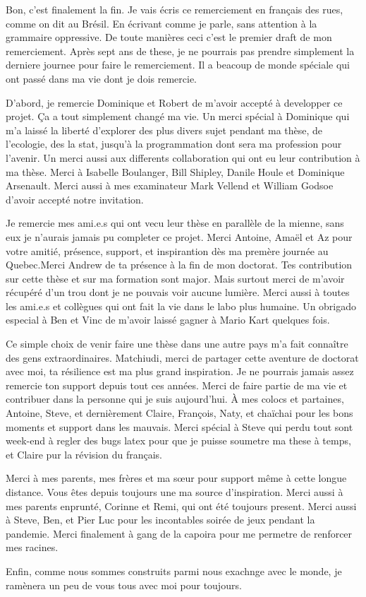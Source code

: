 Bon, c'est finalement la fin. Je vais écris ce remerciement en français des rues, comme on dit au Brésil. En écrivant comme je parle, sans attention à la grammaire oppressive.
De toute manières ceci c'est le premier draft de mon remerciement. Après sept ans de these, je ne pourrais pas prendre simplement la derniere journee pour faire le remerciement. Il a beacoup de monde spéciale qui ont passé dans ma vie dont je dois remercie.

D'abord, je remercie Dominique et Robert de m'avoir accepté à developper ce projet. Ça a tout simplement changé ma vie.
Un merci spécial à Dominique qui m'a laissé la liberté d'explorer des plus divers sujet pendant ma thèse, de l'ecologie, des la stat, jusqu'à la programmation dont sera ma profession pour l'avenir.
Un merci aussi aux differents collaboration qui ont eu leur contribution à ma thèse. Merci à Isabelle Boulanger, Bill Shipley, Danile Houle et Dominique Arsenault. Merci aussi à mes examinateur Mark Vellend et William Godsoe d'avoir accepté notre invitation.

Je remercie mes ami.e.s qui ont vecu leur thèse en parallèle de la mienne, sans eux je n'aurais jamais pu completer ce projet.
Merci Antoine, Amaël et Az pour votre amitié, présence, support, et inspirantion dès ma premère journée au Quebec.Merci Andrew de ta présence à la fin de mon doctorat. Tes contribution sur cette thèse et sur ma formation sont major. Mais surtout merci de m'avoir récupéré d'un trou dont je ne pouvais voir aucune lumière.
Merci aussi à toutes les ami.e.s et collègues qui ont fait la vie dans le labo plus humaine. Un obrigado especial à Ben et Vinc de m'avoir laissé gagner à Mario Kart quelques fois.

Ce simple choix de venir faire une thèse dans une autre pays m'a fait connaître des gens extraordinaires.
Matchiudi, merci de partager cette aventure de doctorat avec moi, ta résilience est ma plus grand inspiration. Je ne pourrais jamais assez remercie ton support depuis tout ces années. Merci de faire partie de ma vie et contribuer dans la personne qui je suis aujourd'hui. À mes colocs et partaines, Antoine, Steve, et dernièrement Claire, François, Naty, et chaïchai pour les bons moments et support dans les mauvais. Merci spécial à Steve qui perdu tout sont week-end à regler des bugs latex pour que je puisse soumetre ma these à temps, et Claire pur la révision du français.

Merci à mes parents, mes frères et ma sœur pour support même à cette longue distance. Vous êtes depuis toujours une ma source d'inspiration. Merci aussi à mes parents enprunté, Corinne et Remi, qui ont été toujours present. Merci aussi à Steve, Ben, et Pier Luc pour les incontables soirée de jeux pendant la pandemie. Merci finalement à gang de la capoira pour me permetre de renforcer mes racines.

Enfin, comme nous sommes construits parmi nous exachnge avec le monde, je ramènera un peu de vous tous avec moi pour toujours.
